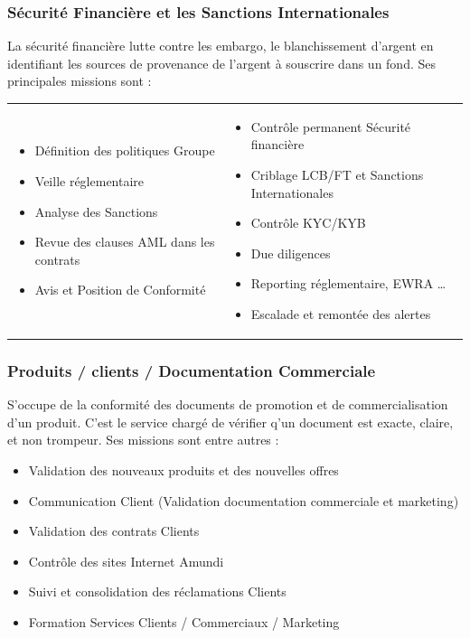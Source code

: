 \documentclass[12pt,a4paper]{report}
\begin{document}
\subsubsection{Sécurité Financière et les Sanctions Internationales}
La sécurité financière lutte contre les embargo, le blanchissement d'argent en identifiant les sources de provenance de l'argent à souscrire dans un fond. Ses principales missions sont :\newline 
\begin{tabular}{p{}p{}}
\flushleft 
\begin{itemize}
\item Définition des politiques Groupe
\item Veille réglementaire
\item Analyse des Sanctions
\item Revue des clauses AML dans les contrats
\item Avis et Position de Conformité
\end{itemize}

& \flushright
\begin{itemize}
\item Contrôle permanent Sécurité financière
\item Criblage LCB/FT et Sanctions Internationales
\item Contrôle KYC/KYB
\item Due diligences
\item Reporting réglementaire, EWRA …
\item Escalade et remontée des alertes
\end{itemize}

\end{tabular}

\subsubsection{Produits / clients / Documentation Commerciale}
S'occupe de la conformité des documents de promotion et de commercialisation d'un produit. C'est le service chargé de vérifier q'un document est exacte, claire, et non trompeur. Ses missions sont entre autres : \newline
\begin{itemize}
\item Validation des nouveaux produits et des nouvelles offres
\item Communication Client (Validation documentation commerciale et marketing)
\item Validation des contrats Clients
\item Contrôle des sites Internet Amundi
\item Suivi et consolidation des réclamations Clients
\item Formation Services Clients / Commerciaux / Marketing
\end{itemize}
\end{document}
